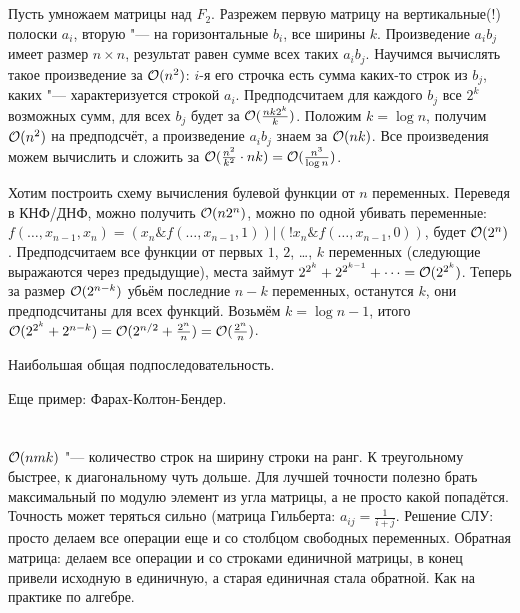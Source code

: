 \section{} %
Пусть умножаем матрицы над $F_2$.
Разрежем первую матрицу на вертикальные(!) полоски $a_i$, вторую "--- на горизонтальные $b_i$, все ширины $k$.
Произведение $a_ib_j$ имеет размер $n \times n$, результат равен сумме всех таких $a_ib_j$.
Научимся вычислять такое произведение за $\mathcal{O}(n^2)$: $i$-я его строчка есть сумма каких-то строк из $b_j$, каких "--- характеризуется строкой $a_i$.
Предподсчитаем для каждого $b_j$ все $2^k$ возможных сумм, для всех $b_j$ будет за $\mathcal{O}(\frac{nk2^k}{k})$.
Положим $k=\log n$, получим $\mathcal{O}(n^2)$ на предподсчёт, а произведение $a_ib_j$ знаем за $\mathcal{O}(nk)$.
Все произведения можем вычислить и сложить за $\mathcal{O}(\frac{n^2}{k^2} \cdot nk) = \mathcal{O}(\frac{n^3}{\log n})$.

Хотим построить схему вычисления булевой функции от $n$ переменных.
Переведя в КНФ/ДНФ, можно получить $\mathcal{O}(n2^n)$, можно по одной убивать переменные: $f(\dots, x_{n-1}, x_n) = (x_n \& f(\dots, x_{n-1}, 1)) | (!x_n \& f(\dots, x_{n-1}, 0))$, будет $\mathcal{O}(2^n)$.
Предподсчитаем все функции от первых $1$, $2$, \dots, $k$ переменных (следующие выражаются через предыдущие), места займут $2^{2^k} + 2^{2^{k-1}} + \dots = \mathcal{O}(2^{2^k})$.
Теперь за размер $\mathcal{O}(2^{n-k})$ убьём последние $n-k$ переменных, останутся $k$, они предподсчитаны для всех функций.
Возьмём $k=\log n - 1$, итого $\mathcal{O}(2^{2^k} + 2^{n-k})=\mathcal{O}(2^{n/2}+\frac{2^n}{n})=\mathcal{O}(\frac{2^n}{n})$.

\TODO Наибольшая общая подпоследовательность.

Еще пример: Фарах-Колтон-Бендер.

\section{} %
$\mathcal{O}(nmk)$ "--- количество строк на ширину строки на ранг.
К треугольному быстрее, к диагональному чуть дольше.
Для лучшей точности полезно брать максимальный по модулю элемент из угла матрицы, а не просто какой попадётся.
Точность может теряться сильно (матрица Гильберта: $a_{ij}=\frac{1}{i+j}$.
Решение СЛУ: просто делаем все операции еще и со столбцом свободных переменных.
Обратная матрица: делаем все операции и со строками единичной матрицы, в конец привели исходную в единичную, а старая единичная стала обратной.
Как на практике по алгебре.

